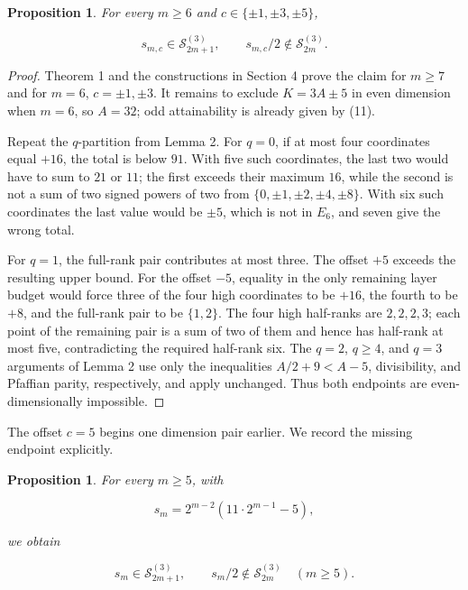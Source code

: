 \documentclass[11pt]{article}
\newtheorem{proposition}[theorem]{Proposition}
\begin{document}
\begin{proposition}


For every $m\geq6$ and $c\in\{\pm1,\pm3,\pm5\}$,

\[
s_{m,c}\in\mathcal S_{2m+1}^{(3)},
\qquad
s_{m,c}/2\notin\mathcal S_{2m}^{(3)}.
\tag{14}
\]

\end{proposition}

\begin{proof}


Theorem 1 and the constructions in Section 4 prove the claim for $m\geq7$ and for
$m=6$, $c=\pm1,\pm3$. It remains to exclude $K=3A\pm5$ in even dimension when
$m=6$, so $A=32$; odd attainability is already given by (11).

Repeat the $q$-partition from Lemma 2. For $q=0$, if at most four coordinates equal $+16$, the
total is below $91$. With five such coordinates, the last two would have to sum to $21$ or $11$;
the first exceeds their maximum $16$, while the second is not a sum of two signed powers of two
from $\{0,\pm1,\pm2,\pm4,\pm8\}$. With six such coordinates the last value would be $\pm5$,
which is not in $E_6$, and seven give the wrong total.

For $q=1$, the full-rank pair contributes at most three. The offset $+5$ exceeds the resulting
upper bound. For the offset $-5$, equality in the only remaining layer budget would force three
of the four high coordinates to be $+16$, the fourth to be $+8$, and the full-rank pair to be
$\{1,2\}$. The four high half-ranks are $2,2,2,3$; each point of the remaining pair is a sum of
two of them and hence has half-rank at most five, contradicting the required half-rank six.
The $q=2$, $q\geq4$, and $q=3$ arguments of Lemma 2 use only the inequalities
$A/2+9<A-5$, divisibility, and Pfaffian parity, respectively, and apply unchanged. Thus both
endpoints are even-dimensionally impossible.
\end{proof}


The offset $c=5$ begins one dimension pair earlier. We record the missing endpoint explicitly.

\begin{proposition}


For every $m\geq5$, with

\[
s_m=2^{m-2}(11\cdot2^{m-1}-5),
\]

we obtain

\[
s_m\in\mathcal S_{2m+1}^{(3)},
\qquad
s_m/2\notin\mathcal S_{2m}^{(3)}
\quad(m\geq5).
\tag{15}
\]

\end{proposition}
\end{document}
